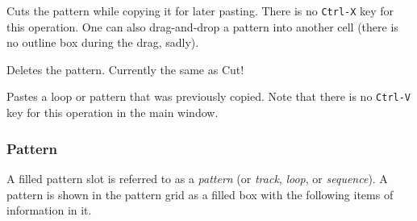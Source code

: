    Cuts the pattern while copying it for later pasting.
   There is no \texttt{Ctrl-X} key for this operation.
   One can also drag-and-drop a pattern into another cell (there is no outline
   box during the drag, sadly).

   Deletes the pattern.  Currently the same as Cut!

   Pastes a loop or pattern that was previously copied.
   Note that there is no \texttt{Ctrl-V} key for this operation in the
   main window.
   
\subsubsection{Pattern}
\label{subsubsec:patterns_pattern_filled}

   A filled pattern slot is referred to as a \textsl{pattern}
   (or \textsl{track}, \textsl{loop}, or \textsl{sequence}).
   A pattern is shown in the pattern grid as a filled box with the
   following items of information in it.

